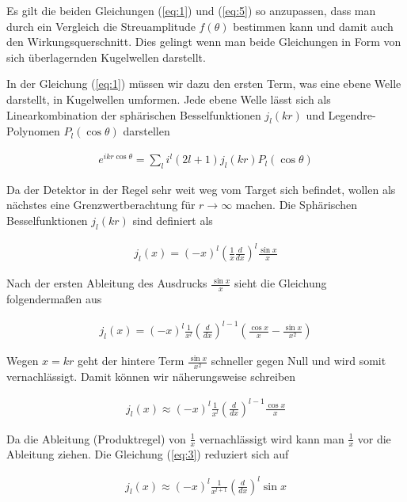 Es gilt die beiden Gleichungen (\ref{eq:1}) und (\ref{eq:5}) so anzupassen, dass man durch ein Vergleich die Streuamplitude \(f(\theta)\) bestimmen kann und damit auch den Wirkungsquerschnitt. Dies gelingt wenn man beide Gleichungen in Form von sich überlagernden Kugelwellen darstellt. 

In der Gleichung (\ref{eq:1}) müssen wir dazu den ersten Term, was eine ebene Welle darstellt, in Kugelwellen umformen. Jede ebene Welle lässt sich als Linearkombination der sphärischen Besselfunktionen \(j_l(kr)\) und Legendre-Polynomen \(P_l(\cos\theta)\) darstellen

\begin{align}
  \label{eq:2}
  e^{ikr\cos\theta} = \sum_{l}i^l(2l+1)j_l(kr)P_l(\cos\theta)
\end{align}

Da der Detektor in der Regel sehr weit weg vom Target sich befindet, wollen als nächstes eine Grenzwertberachtung für \(r\to\infty\) machen. Die Sphärischen  Besselfunktionen \(j_l(kr)\) sind definiert als

\begin{align}
  \label{eq:3}
  j_l(x) = (-x)^l\left( \frac{1}{x}\frac{d}{dx}\right)^l \frac{\sin x}{x}
\end{align}

Nach der ersten Ableitung des Ausdrucks \(\frac{\sin x}{x}\) sieht die Gleichung folgendermaßen aus

\begin{align}
  \label{eq:7}
  j_l(x) = (-x)^l \frac{1}{x^l} \left(\frac{d}{dx}\right)^{l-1}\left(\frac{\cos x}{x} - \frac{\sin x}{x^2} \right)
\end{align}

Wegen \(x=kr\) geht der hintere Term \(\frac{\sin x}{x^2}\) schneller gegen Null und wird somit vernachlässigt. Damit können wir näherungsweise schreiben

\begin{align}
  \label{eq:8}
  j_l(x) \approx (-x)^l \frac{1}{x^l} \left(\frac{d}{dx}\right)^{l-1} \frac{\cos x}{x} 
\end{align}

Da die Ableitung (Produktregel) von \(\frac{1}{x}\) vernachlässigt wird kann man \(\frac{1}{x}\) vor die Ableitung ziehen. Die Gleichung (\ref{eq:3}) reduziert sich auf

\begin{align}
  \label{eq:9}
    j_l(x) \approx (-x)^l\frac{1}{x^{l+1}}\left( \frac{d}{dx}\right)^l \sin x
\end{align}

